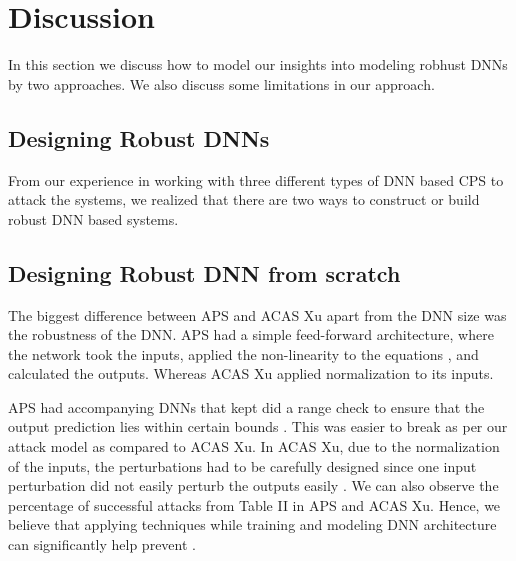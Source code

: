 \chapter{Discussion}
In this section we discuss how to model our insights into modeling robhust  
DNNs by two approaches.  
We also discuss some limitations in our approach.

\section{Designing Robust DNNs}
From our experience in working with three different types of DNN based CPS to attack the systems, we realized that there are two ways to construct or build robust DNN based systems. 

\section{Designing Robust DNN from scratch}
The biggest difference between APS and ACAS Xu apart from the DNN size was the robustness of the DNN. APS had a simple feed-forward architecture, where the network took the inputs, applied the non-linearity to the equations ,
 and calculated the outputs. Whereas ACAS Xu applied normalization to its inputs. 

APS had accompanying DNNs that kept did a range check to ensure that the output prediction lies within certain bounds . 
This was easier to break as per our attack model as compared to ACAS Xu. 
In ACAS Xu, due to the normalization of the inputs, the perturbations had to be carefully designed since one input perturbation did not easily perturb the outputs easily . 
We can also observe the percentage of successful attacks from Table II  in APS and ACAS Xu. 
Hence, we believe that applying techniques while training and modeling DNN architecture can significantly help prevent \attack. 

